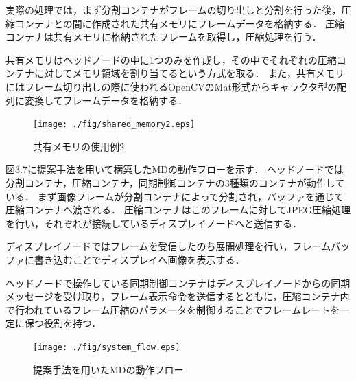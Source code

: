 実際の処理では，まず分割コンテナがフレームの切り出しと分割を行った後，圧縮コンテナとの間に作成された共有メモリにフレームデータを格納する．
圧縮コンテナは共有メモリに格納されたフレームを取得し，圧縮処理を行う．

共有メモリはヘッドノードの中に1つのみを作成し，その中でそれぞれの圧縮コンテナに対してメモリ領域を割り当てるという方式を取る．
また，共有メモリにはフレーム切り出しの際に使われるOpenCVのMat形式からキャラクタ型の配列に変換してフレームデータを格納する．

\begin{figure}[H]
    \hspace*{\fill}
    \texttt{[image: ./fig/shared\_memory2.eps]}
    \hspace*{\fill}
    \caption{共有メモリの使用例2}
\end{figure}


図3.7に提案手法を用いて構築したMDの動作フローを示す．
ヘッドノードでは分割コンテナ，圧縮コンテナ，同期制御コンテナの3種類のコンテナが動作している．
まず画像フレームが分割コンテナによって分割され，バッファを通じて圧縮コンテナへ渡される．
圧縮コンテナはこのフレームに対してJPEG圧縮処理を行い，それぞれが接続しているディスプレイノードへと送信する．

ディスプレイノードではフレームを受信したのち展開処理を行い，フレームバッファに書き込むことでディスプレイへ画像を表示する．

ヘッドノードで操作している同期制御コンテナはディスプレイノードからの同期メッセージを受け取り，フレーム表示命令を送信するとともに，圧縮コンテナ内で行われているフレーム圧縮のパラメータを制御することでフレームレートを一定に保つ役割を持つ．

\begin{figure}[H]
    \hspace*{\fill}
    \texttt{[image: ./fig/system\_flow.eps]}
    \hspace*{\fill}
    \caption{提案手法を用いたMDの動作フロー}
\end{figure}
